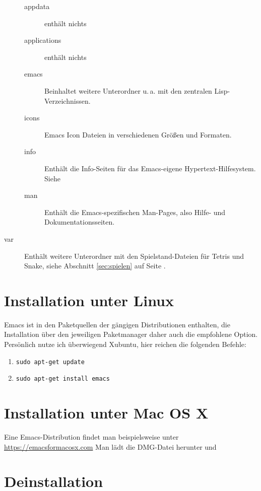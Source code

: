 \documentclass[12pt,ngerman]{scrbook}
\begin{document}
\begin{description}
\begin{description}
\item[appdata] enthält nichts
\item[applications] enthält nichts
\item[emacs] Beinhaltet weitere Unterordner u.\,a. mit den zentralen Lisp-Verzeichnissen.
\item[icons] Emacs Icon Dateien in verschiedenen Größen und Formaten.
\item[info] Enthält die Info-Seiten für das Emacs-eigene Hypertext-Hilfesystem. Siehe 
\item[man] Enthält die Emacs-spezifischen Man-Pages, also Hilfe- und Dokumentationsseiten. 
\end{description}



\item[var] Enthält weitere Unterordner mit den Spielstand-Dateien für Tetris und Snake, siehe Abschnitt \ref{sec:spielen} auf Seite \pageref{sec:spielen}.
\end{description}

\section{Installation unter Linux}

Emacs ist in den Paketquellen der gängigen Distributionen enthalten, die Installation über den jeweiligen Paketmanager daher auch die empfohlene Option. Persönlich nutze ich überwiegend Xubuntu, hier reichen die folgenden Befehle:

\begin{enumerate}
\item \texttt{sudo apt-get update}
\item \texttt{sudo apt-get install emacs}
\end{enumerate}

\section{Installation unter Mac OS X}

Eine Emacs-Distribution findet man beispielsweise unter \url{https://emacsformacosx.com}
Man lädt die DMG-Datei herunter und 


\section{Deinstallation}
\end{document}

